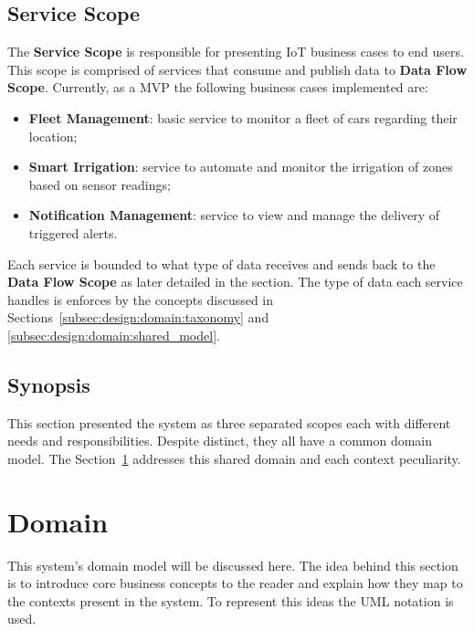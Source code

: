 \subsection{Service Scope}
\label{subsec:design:system_scopes:service_scope}

The \textbf{Service Scope} is responsible for presenting \gls{IoT} business cases to end users. This scope is comprised of services that consume and publish data to \textbf{Data Flow Scope}. Currently, as a \gls{MVP} the following business cases implemented are:

\begin{itemize}
   \item \textbf{Fleet Management}: basic service to monitor a fleet of cars regarding their location;
   \item \textbf{Smart Irrigation}: service to automate and monitor the irrigation of zones based on sensor readings;
   \item \textbf{Notification Management}: service to view and manage the delivery of triggered alerts.
\end{itemize}

Each service is bounded to what type of data receives and sends back to the \textbf{Data Flow Scope} as later detailed in the  section. The type of data each service handles is enforces by the concepts discussed in Sections~\ref{subsec:design:domain:taxonomy} and \ref{subsec:design:domain:shared_model}.

\subsection{Synopsis}
\label{subsec:design:system_scopes:synopsis}

This section presented the system as three separated scopes each with different needs and responsibilities. Despite distinct, they all have a common domain model. The Section~\ref{sec:design:domain} addresses this shared domain and each context peculiarity.

\section{Domain}
\label{sec:design:domain}

This system's domain model will be discussed here. The idea behind this section is to introduce core business concepts to the reader and explain how they map to the contexts present in the system. To represent this ideas the \gls{UML} notation is used.

